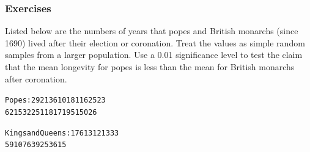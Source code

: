 \documentclass[xcolor=dvipsnames]{beamer}
\begin{document}





\begin{frame}
  \frametitle{Exercises}
 Listed below are the numbers of years that
popes and British monarchs (since 1690) lived after their election
or coronation. Treat the values as simple random samples from a
larger population. Use a 0.01 significance level to test the claim
that the mean longevity for popes is less than the mean for
British monarchs after coronation.

\bigskip

\begin{alltt}
Popes: 2 9 21 3 6 10 18 11 6 25 23 
 6 2 15 32 25 11 8 17 19 5 15 0 26
\end{alltt}

\bigskip

\begin{alltt}
Kings and Queens: 17 6 13 12 13 33
             59 10 7 63 9 25 36 15
\end{alltt}
\end{frame}
\end{document}
